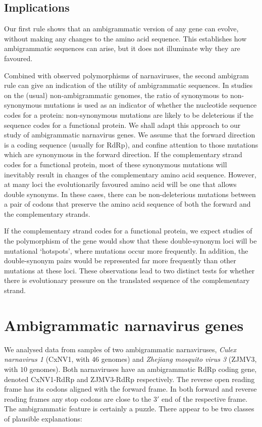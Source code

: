 \documentclass[unnumsec,webpdf,contemporary,large]{oup-authoring-template}%
\theoremstyle{thmstyleone}%
\theoremstyle{thmstyletwo}%
\theoremstyle{thmstylethree}%
\begin{document}
\subsection{{\bf Implications}}
\label{sec: 2.3}

Our first rule shows that an ambigrammatic version of any gene can evolve, without
making any changes to the amino acid sequence. This establishes how ambigrammatic sequences
can arise, but it does not illuminate why they are favoured.

Combined with observed polymorphisms of narnaviruses, the second ambigram rule can give an
indication of the utility of ambigrammatic sequences. In studies on the (usual) non-ambigrammatic
genomes, the ratio of synonymous to non-synonymous mutations is used as an indicator of
whether the nucleotide sequence codes for a protein: non-synonymous mutations
are likely to be deleterious if the sequence codes for a functional protein.
We shall adapt this approach to our study of ambigrammatic narnavirus genes.
We assume that the forward direction is a coding sequence (usually for RdRp),
and confine attention to those mutations which are synonymous in the forward
direction. If the complementary strand codes for a functional protein, most of these
synonymous mutations will inevitably result in changes of the complementary
amino acid sequence. However, at many loci the evolutionarily favoured amino acid
will be one that allows double synonyms. In these cases, there can be
non-deleterious mutations between a pair of codons that preserve the amino acid
sequence of both the forward and the
complementary strands.

If the complementary strand codes for a functional protein, we expect studies of the
polymorphism of the gene would show that these double-synonym loci will be
mutational \lq hotspots', where mutations occur more frequently. In addition, the double-synonym pairs
would be represented far more frequently than other mutations at these loci. These observations
lead to two distinct tests for whether there is evolutionary pressure on the translated sequence of the
complementary strand.

\section{Ambigrammatic narnavirus genes}
\label{sec: 3}

We analysed data from samples of two ambigrammatic narnaviruses,
\emph{Culex narnavirus 1} (CxNV1, with $46$ genomes) and \emph{Zhejiang mosquito virus 3} (ZJMV3, with
$10$ genomes). Both narnaviruses have an ambigrammatic RdRp coding gene, denoted CxNV1-RdRp and
ZJMV3-RdRp respectively. The reverse open reading frame has its codons aligned with the forward frame.
In both forward and reverse reading frames any stop codons are close to the  $3'$ end of the
respective frame.
The ambigrammatic feature is certainly a puzzle. There appear to be two classes
of plausible explanations:
\end{document}
